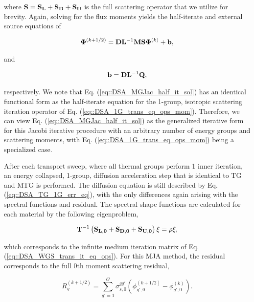 \noindent where ${\bf S} = {\bf S_{L}} + {\bf S_{D}} + {\bf S_{U}}$ is the full scattering operator that we utilize for brevity. Again, solving for the flux moments yields the half-iterate and external source equations of

\begin{equation}
\label{eq::DSA_MGJac_half_it_sol}
{\bf \Phi}^{(k+1/2)} = {\bf D}{\bf L}^{-1}  {\bf M} {\bf S} {\bf \Phi}^{(k)} + {\bf b} ,
\end{equation}

\noindent and

\begin{equation}
\label{eq::DSA_MGJac_half_it_forcingfunc}
{\bf b} = {\bf D}{\bf L}^{-1}  {\bf Q} ,
\end{equation}

\noindent respectively. We note that Eq. (\ref{eq::DSA_MGJac_half_it_sol}) has an identical functional form as the half-iterate equation for the 1-group, isotropic scattering iteration operator of Eq. (\ref{eq::DSA_1G_trans_eq_ops_mom}). Therefore, we can view Eq. (\ref{eq::DSA_MGJac_half_it_sol}) as the generalized iterative form for this Jacobi iterative procedure with an arbitrary number of energy groups and scattering moments, with Eq. (\ref{eq::DSA_1G_trans_eq_ops_mom}) being a specialized case.

After each transport sweep, where all thermal groups perform 1 inner iteration, an energy collapsed, 1-group, diffusion acceleration step that is identical to TG and MTG is performed. The diffusion equation is still described by Eq. (\ref{eq::DSA_TG_1G_err_eq}), with the only differences again arising with the spectral functions and residual. The spectral shape functions are calculated for each material by the following eigenproblem,

\begin{equation}
\label{eq::DSA_WGS_eigenpprob}
{\bf T}^{-1} \left( {\bf S_{L,0}} + {\bf S_{D,0}}+ {\bf S_{U,0}} \right)\xi = \rho \xi ,
\end{equation}

\noindent which corresponds to the infinite medium iteration matrix of Eq. (\ref{eq::DSA_WGS_trans_it_eq_ops}). For this MJA method, the residual corresponds to the full 0th moment scattering residual,


\begin{equation}
\label{eq::DSA_WGS_diff_residual}
R_g^{(k+1/2)} = \sum_{g'=1}^G \sigma_{s,0}^{g g'} \left( \phi_{g',0}^{(k+1/2)} - \phi_{g',0}^{(k)} \right) .
\end{equation}

